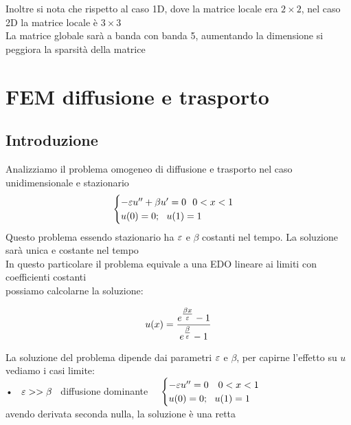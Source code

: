 \documentclass{article}
\begin{document}
\phantom{}

Inoltre si nota che rispetto al caso 1D, dove la matrice locale era $2\times2$, nel caso 2D la matrice locale è $3\times3$\\
La matrice globale sarà a banda con banda 5, aumentando la dimensione si peggiora la sparsità della matrice\\



\newpage





\section{FEM diffusione e trasporto}

\subsection{Introduzione}


Analizziamo il problema omogeneo di diffusione e trasporto nel caso unidimensionale e stazionario
\[
\begin{cases}
    -\varepsilon u'' + \beta u' =0 \ \ 0<x<1\\
    u(0)=0; \ \ u(1)=1
\end{cases} 
\]
Questo problema essendo stazionario ha $\varepsilon$ e $\beta$ costanti nel tempo. La soluzione sarà unica e costante nel tempo\\

In questo particolare il problema equivale a una EDO lineare ai limiti con coefficienti costanti\\ possiamo calcolarne la soluzione:




\[u(x)=\dfrac{e^{\tfrac{\beta x}{\varepsilon}}-1}{e^{\tfrac{\beta}{\varepsilon}}-1}\]

La soluzione del problema dipende dai parametri $\varepsilon$ e $\beta$, per capirne l'effetto su $u$ vediamo i casi limite:\\

• \ $\varepsilon >> \beta$ \ diffusione dominante \ \ $\begin{cases}
    -\varepsilon u'' =0 \ \ \ 0<x<1\\
    u(0)=0; \ \ u(1)=1
\end{cases}$ \\ avendo derivata seconda nulla, la soluzione è una retta\\
\end{document}
